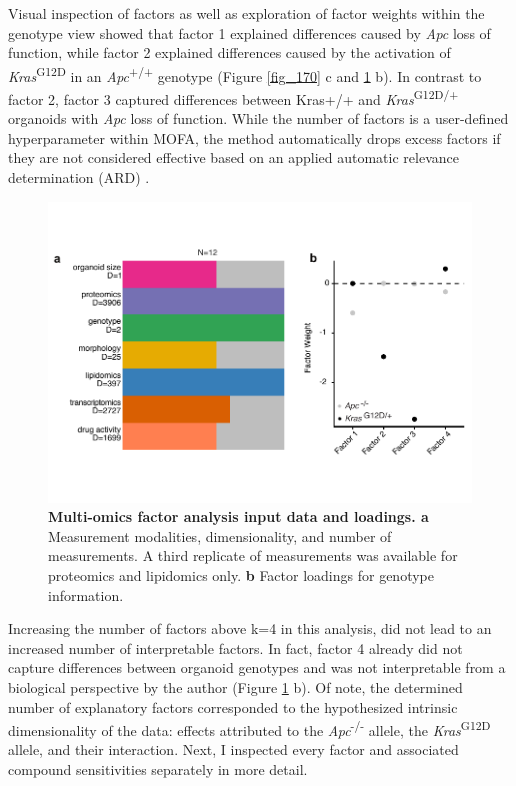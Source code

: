 \begin{flushleft}
Visual inspection of factors as well as exploration of factor weights within the genotype view showed that factor 1 explained differences caused by \textit{Apc} loss of function, while factor 2 explained differences caused by the activation of \textit{Kras}\textsuperscript{G12D} in an \textit{Apc}\textsuperscript{+/+} genotype (Figure \ref{fig_170} c and \ref{fig_180} b). In contrast to factor 2, factor 3 captured differences between Kras+/+ and \textit{Kras}\textsuperscript{G12D/+} organoids with \textit{Apc} loss of function. While the number of factors is a user-defined hyperparameter within MOFA, the method automatically drops excess factors if they are not considered effective based on an applied automatic relevance determination (ARD) \parencite{argelaguetMultiOmicsFactorAnalysis2018b}. 

\begin{figure}[h!]
\centering
\includegraphics[width=400pt,
                height=\textheight,
                keepaspectratio]{figures/adenomaprofiling/pdf/fig_1_8.pdf}
\caption[Multi-omics factor analysis input data and loadings]{\textbf{Multi-omics factor analysis input data and loadings. a} Measurement modalities, dimensionality, and number of measurements. A third replicate of measurements was available for proteomics and lipidomics only. \textbf{b} Factor loadings for genotype information.} 
\label{fig_180}
\end{figure}

Increasing the number of factors above k=4 in this analysis, did not lead to an increased number of interpretable factors. In fact, factor 4 already did not capture differences between organoid genotypes and was not interpretable from a biological perspective by the author (Figure \ref{fig_180} b). Of note, the determined number of explanatory factors corresponded to the hypothesized intrinsic dimensionality of the data: effects attributed to the \textit{Apc}\textsuperscript{-/-}  allele, the \textit{Kras}\textsuperscript{G12D} allele, and their interaction. Next, I inspected every factor and associated compound sensitivities separately in more detail.


\end{flushleft}
